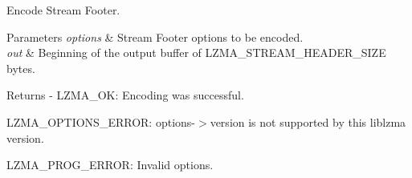 Encode Stream Footer. 


\begin{DoxyParams}{Parameters}
{\em options} & Stream Footer options to be encoded. \\
\hline
{\em out} & Beginning of the output buffer of L\+Z\+M\+A\+\_\+\+S\+T\+R\+E\+A\+M\+\_\+\+H\+E\+A\+D\+E\+R\+\_\+\+S\+I\+ZE bytes.\\
\hline
\end{DoxyParams}
\begin{DoxyReturn}{Returns}
-\/ L\+Z\+M\+A\+\_\+\+OK\+: Encoding was successful.
\begin{DoxyItemize}
\item L\+Z\+M\+A\+\_\+\+O\+P\+T\+I\+O\+N\+S\+\_\+\+E\+R\+R\+OR\+: options-\/$>$version is not supported by this liblzma version.
\item L\+Z\+M\+A\+\_\+\+P\+R\+O\+G\+\_\+\+E\+R\+R\+OR\+: Invalid options. 
\end{DoxyItemize}
\end{DoxyReturn}
